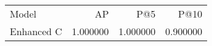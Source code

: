 \begin{tabular}{lrrr}
Model & AP & P@5 & P@10 \\
Enhanced C & 1.000000 & 1.000000 & 0.900000 \\
\end{tabular}
